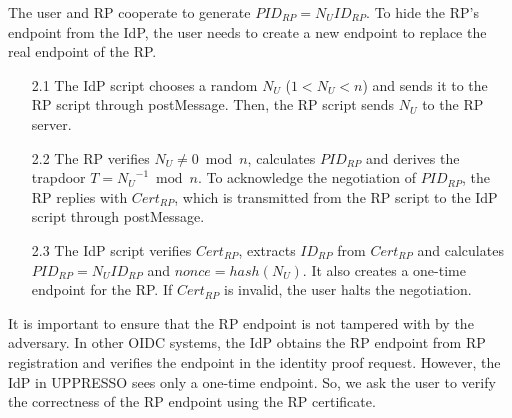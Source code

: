 The user and RP cooperate to generate $PID_{RP} = {N_{U}}{ID_{RP}}$. To hide the RP's endpoint from the IdP, the user needs to create a new endpoint to replace the real endpoint of the RP.
\vspace{-\topsep}
\begin{itemize}
\item[2.1] The IdP script chooses a random $N_U$ ($1 < N_U <n$) and sends it to the RP script through postMessage. Then, the RP script sends $N_U$ to the RP server.
\vspace{-\topsep}
\item[2.2] The RP verifies $N_{U} \neq 0 \bmod n$, calculates $PID_{RP}$ and derives the trapdoor $T={N_U}^{-1} \bmod n$. To acknowledge the negotiation of $PID_{RP}$, the RP replies with $Cert_{RP}$, which is transmitted from the RP script to the IdP script through postMessage.
\vspace{-\topsep}
\item[2.3] The IdP script verifies $Cert_{RP}$, extracts $ID_{RP}$ from $Cert_{RP}$ and calculates $PID_{RP}={N_{U}}{ID_{RP}}$ and $nonce=hash(N_U)$. It also creates a one-time endpoint for the RP. If $Cert_{RP}$ is invalid, the user halts the negotiation.
\end{itemize}
\vspace{-\topsep}
It is important to ensure that the RP endpoint is not tampered with by the adversary. In other OIDC systems, the IdP obtains the RP endpoint from RP registration and verifies the endpoint in the identity proof request. However, the IdP in UPPRESSO sees only a one-time endpoint. So, we ask the user to verify the correctness of the RP endpoint using the RP certificate. %


